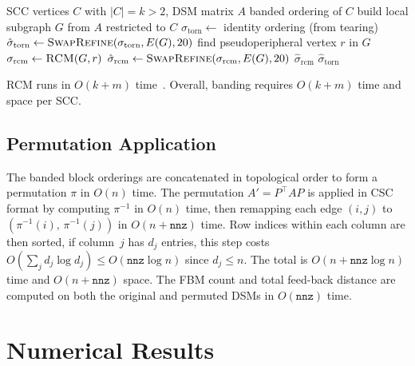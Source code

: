 \documentclass[12pt]{article}
\theoremstyle{definition}
\begin{document}
\begin{algorithm}[H]
	\caption{Banding an SCC}\label{alg:banding}
	\begin{algorithmic}[1]
		\Require SCC vertices $C$ with $|C| = k > 2$, DSM matrix $A$
		\Ensure banded ordering of $C$
		\State build local subgraph $G$ from $A$ restricted to $C$
		\State $\sigma_{\text{torn}} \gets$ identity ordering (from tearing)
		\State $\hat{\sigma}_{\text{torn}} \gets \Call{SwapRefine}{\sigma_{\text{torn}}, E(G), 20}$ 
		\State find pseudoperipheral vertex $r$ in $G$ 
		\State $\sigma_{\text{rcm}} \gets \Call{RCM}{G, r}$ 
		\State $\hat{\sigma}_{\text{rcm}} \gets \Call{SwapRefine}{\sigma_{\text{rcm}}, E(G), 20}$
		\State \Return $\hat{\sigma}_{\text{rcm}}$
		\EndIf
		\EndIf
		\State \Return $\hat{\sigma}_{\text{torn}}$
	\end{algorithmic}
\end{algorithm}

\noindent RCM runs in $O(k + m)$ time~\cite{cuthill1969reducing,george1971computer}. Overall, banding requires $O(k + m)$ time and space per SCC.

\subsection{Permutation Application}

The banded block orderings are concatenated in topological order to form a permutation $\pi$ in $O(n)$ time. The permutation $A' = P^\top A P$ is applied in CSC format by computing $\pi^{-1}$ in $O(n)$ time, then remapping each edge $(i,j)$ to $(\pi^{-1}(i),\, \pi^{-1}(j))$ in $O(n + \mathtt{nnz})$ time. Row indices within each column are then sorted, if column~$j$ has $d_j$ entries, this step costs $O(\sum_j d_j \log d_j) \leq O(\mathtt{nnz}\log n)$ since $d_j \leq n$. The total is $O(n + \mathtt{nnz}\log n)$ time and $O(n + \mathtt{nnz})$ space. The FBM count and total feed-back distance are computed on both the original and permuted DSMs in $O(\mathtt{nnz})$ time.

\section{Numerical Results}\label{sec:results}
\end{document}
